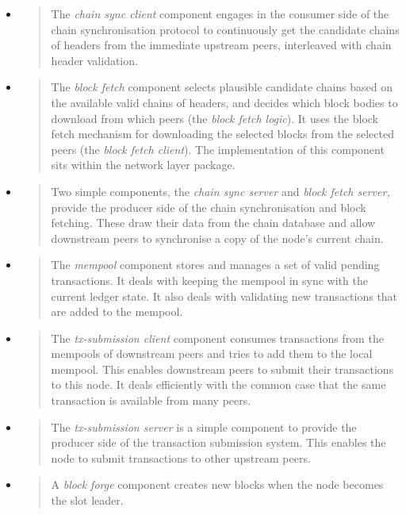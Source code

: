 \documentclass[11pt,a4paper]{article}
\begin{document}
\begin{itemize}
\begin{itemize}
\begin{quote}
    \end{quote}
  \end{itemize}
\item
  \begin{quote}
  The \emph{chain sync client} component engages in the consumer side of
  the chain synchronisation protocol to continuously get the candidate
  chains of headers from the immediate upstream peers, interleaved with
  chain header validation.
  \end{quote}
\item
  \begin{quote}
  The \emph{block fetch} component selects plausible candidate chains
  based on the available valid chains of headers, and decides which
  block bodies to download from which peers (the \emph{block fetch
  logic}). It uses the block fetch mechanism for downloading the
  selected blocks from the selected peers (the \emph{block fetch
  client}). The implementation of this component sits within the network
  layer package.
  \end{quote}
\item
  \begin{quote}
  Two simple components, the \emph{chain sync server} and \emph{block
  fetch server,} provide the producer side of the chain synchronisation
  and block fetching. These draw their data from the chain database and
  allow downstream peers to synchronise a copy of the node's current
  chain.
  \end{quote}
\item
  \begin{quote}
  The \emph{mempool} component stores and manages a set of valid pending
  transactions. It deals with keeping the mempool in sync with the
  current ledger state. It also deals with validating new transactions
  that are added to the mempool.
  \end{quote}
\item
  \begin{quote}
  The \emph{tx-submission client} component consumes transactions from
  the mempools of downstream peers and tries to add them to the local
  mempool. This enables downstream peers to submit their transactions to
  this node. It deals efficiently with the common case that the same
  transaction is available from many peers.
  \end{quote}
\item
  \begin{quote}
  The \emph{tx-submission server} is a simple component to provide the
  producer side of the transaction submission system. This enables the
  node to submit transactions to other upstream peers.
  \end{quote}
\item
  \begin{quote}
  A \emph{block forge} component creates new blocks when the node
  becomes the slot leader.
  \end{quote}
\end{itemize}
\end{document}
